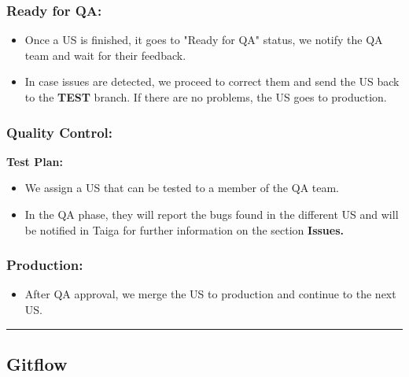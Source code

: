 \documentclass{article}
\providecommand{\tightlist}{
  \setlength{\itemsep}{0pt}\setlength{\parskip}{0pt}}
\begin{document}
\hypertarget{readyforqa}{
\subsubsection{Ready for QA:}\label{readyforqa}}

\begin{itemize}
\tightlist
\item
  Once a US is finished, it goes to "Ready for QA" status, we notify the
  QA team and wait for their feedback.
\item
  In case issues are detected, we proceed to correct them and send the
  US back to the \textbf{TEST} branch. If there are no problems, the US
  goes to production.
\end{itemize}

\hypertarget{qualitycontrolnbsp}{
\subsubsection{Quality Control:~}\label{qualitycontrolnbsp}}

\textbf{Test Plan:}
\begin{itemize}
\tightlist
\item
  We assign a US that can be tested to a member of the QA team.
\item
  In the QA phase, they will report the bugs found in the different US
  and will be notified in Taiga for further information on the section
  \textbf{Issues.}
\end{itemize}

\hypertarget{productionnbsp}{
\subsubsection{Production:~}\label{productionnbsp}}

\begin{itemize}
\tightlist
\item
  After QA approval, we merge the US to production and continue to the
  next US.
\end{itemize}

\begin{center}\rule{0.5\linewidth}{0.5pt}\end{center}

\hypertarget{gitflow}{
\subsection{Gitflow}\label{gitflow}}
\end{document}
